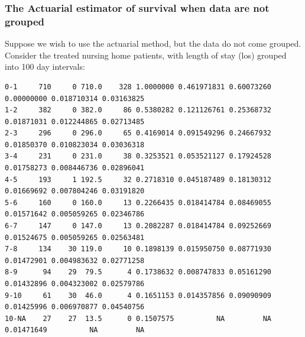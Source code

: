\documentclass[11pt,slidesonly,semrot,portrait,palatino]{book}
\begin{document}
\subsubsection{The Actuarial estimator of survival when data are not grouped}
Suppose we wish to use the actuarial method, but the data do not come grouped.
\\[2ex]
Consider the treated nursing home patients, with length of stay (los)
grouped into 100 day intervals:
\scriptsize
\begin{verbatim}
0-1     710     0 710.0    328 1.0000000 0.461971831 0.60073260 0.00000000 0.018710314 0.03163825
1-2     382     0 382.0     86 0.5380282 0.121126761 0.25368732 0.01871031 0.012244865 0.02713485
2-3     296     0 296.0     65 0.4169014 0.091549296 0.24667932 0.01850370 0.010823034 0.03036318
3-4     231     0 231.0     38 0.3253521 0.053521127 0.17924528 0.01758273 0.008446736 0.02896041
4-5     193     1 192.5     32 0.2718310 0.045187489 0.18130312 0.01669692 0.007804246 0.03191820
5-6     160     0 160.0     13 0.2266435 0.018414784 0.08469055 0.01571642 0.005059265 0.02346786
6-7     147     0 147.0     13 0.2082287 0.018414784 0.09252669 0.01524675 0.005059265 0.02563481
7-8     134    30 119.0     10 0.1898139 0.015950750 0.08771930 0.01472901 0.004983632 0.02771258
8-9      94    29  79.5      4 0.1738632 0.008747833 0.05161290 0.01432896 0.004323002 0.02579786
9-10     61    30  46.0      4 0.1651153 0.014357856 0.09090909 0.01425996 0.006970877 0.04540756
10-NA    27    27  13.5      0 0.1507575          NA         NA 0.01471649          NA         NA
\end{verbatim}

\end{document}
